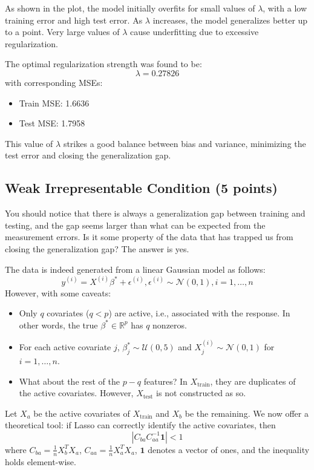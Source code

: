\documentclass{article}
\begin{document}
\begin{enumerate}[label=(\alph*)]
As shown in the plot, the model initially overfits for small values of \( \lambda \), with a low training error and high test error. As \( \lambda \) increases, the model generalizes better up to a point. Very large values of \( \lambda \) cause underfitting due to excessive regularization.

The optimal regularization strength was found to be:
\[
\lambda = 0.27826
\]
with corresponding MSEs:
\begin{itemize}
    \item Train MSE: 1.6636
    \item Test MSE: 1.7958
\end{itemize}
\end{enumerate}
This value of \( \lambda \) strikes a good balance between bias and variance, minimizing the test error and closing the generalization gap.

\subsection{Weak Irrepresentable Condition (5 points)}

You should notice that there is always a generalization gap between training and testing, and the gap seems
larger than what can be expected from the measurement errors. Is it some property of the data that has
trapped us from closing the generalization gap? The answer is yes.

The data is indeed generated from a linear Gaussian model as follows:
\[y^{(i)} = X^{(i)}\beta^* + \epsilon^{(i)}, \epsilon^{(i)} \sim \mathcal{N}(0, 1), i = 1, \ldots, n \tag{2}\]
However, with some caveats:
\begin{itemize}
\item Only $q$ covariates ($q < p$) are active, i.e., associated with the response. In other words, the true $\beta^* \in \mathbb{R}^p$
has $q$ nonzeros.
\item For each active covariate $j$, $\beta^*_j \sim \mathcal{U}(0, 5)$ and $X^{(i)}_j \sim \mathcal{N}(0, 1)$ for $i = 1, \ldots, n$.
\item What about the rest of the $p - q$ features? In $X_{\text{train}}$, they are duplicates of the active covariates.
However, $X_{\text{test}}$ is not constructed as so.
\end{itemize}

Let $X_a$ be the active covariates of $X_{\text{train}}$ and $X_b$ be the remaining. We now offer a theoretical tool: if
Lasso can correctly identify the active covariates, then
\[|C_{ba}C_{aa}^{-1} \mathbf{1}| < 1 \tag{3}\]
where $C_{ba} = \frac{1}{n}X_b^T X_a$, $C_{aa} = \frac{1}{n}X_a^T X_a$, $\mathbf{1}$ denotes a vector of ones, and the inequality holds element-wise.
\end{document}
